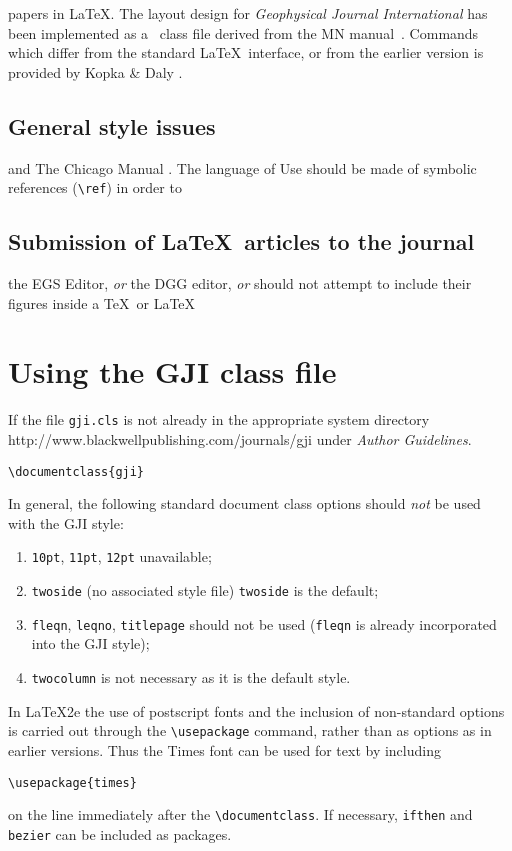 papers in \LaTeX. The layout design for \textit{Geophysical Journal
International} has been implemented as a \LaTeXe\ class file derived from the MN
manual~\cite{la}. Commands which differ from the standard \LaTeX\ interface, or
from the earlier version is provided by Kopka \& Daly .

\subsection{General style issues}

 and The Chicago Manual . The language of
Use should be made of symbolic references (\verb"\ref") in order to

\subsection{Submission of \LaTeX\ articles to the journal}

the EGS Editor,  {\em or\/} the DGG editor,  {\em or\/}
should not attempt to include their figures inside a \TeX\ or \LaTeX\

\section{Using the GJI class file}

If the file \verb"gji.cls" is not already in the appropriate system directory
http://www.blackwellpublishing.com/journals/gji under {\em Author Guidelines}.

\begin{verbatim}
\documentclass{gji}
\end{verbatim}
In general, the following standard document class options should {\em not\/} be
used with the GJI style:
\begin{enumerate}
  \item \texttt{10pt}, \texttt{11pt}, \texttt{12pt} \textendash{} unavailable;
  \item \texttt{twoside} (no associated style file) \textendash{}
     \texttt{twoside} is the default;
   \item \texttt{fleqn}, \texttt{leqno}, \texttt{titlepage} \textendash{} should
     not be used (\verb"fleqn" is already incorporated into the GJI style);
  \item \texttt{twocolumn} \textendash{} is not necessary as it is the default
    style.
\end{enumerate}

In \LaTeX2e the use of postscript fonts and the inclusion of non-standard
options is carried out through the \verb"\usepackage" command, rather than as
options as in earlier versions.  Thus the Times font can be used for text by
including
\begin{verbatim}
\usepackage{times}
\end{verbatim}
on the line immediately after the \verb"\documentclass". If necessary,
\texttt{ifthen} and \texttt{bezier} can be included as packages.

